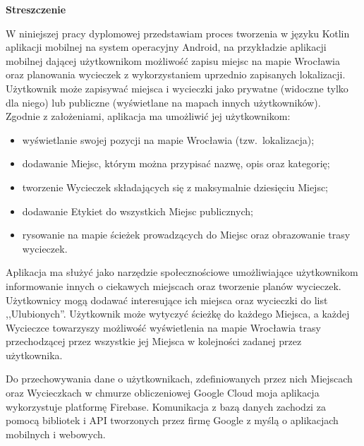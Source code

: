 \newpage

    \begin{flushleft}
    \Large \textbf{Streszczenie}
    \end{flushleft}

    \vspace{1cm}
        W niniejszej pracy dyplomowej przedstawiam proces tworzenia w języku Kotlin aplikacji mobilnej na system operacyjny Android, na przykładzie
        aplikacji mobilnej dającej użytkownikom możliwość zapisu miejsc na mapie Wrocławia oraz planowania wycieczek z wykorzystaniem uprzednio zapisanych lokalizacji.
        Użytkownik może zapisywać miejsca i wycieczki jako prywatne (widoczne tylko dla niego) lub publiczne (wyświetlane na mapach innych użytkowników). \\ 
        
        
        \noindent Zgodnie z założeniami, aplikacja ma umożliwić jej użytkownikom:
        \begin{itemize}
            \item wyświetlanie swojej pozycji na mapie Wrocławia (tzw.\ lokalizacja);
            \item dodawanie Miejsc, którym można przypisać nazwę, opis oraz kategorię;
            \item tworzenie Wycieczek składających się z maksymalnie dziesięciu Miejsc;
            \item dodawanie Etykiet do wszystkich Miejsc publicznych; 
            \item rysowanie na mapie ścieżek prowadzących do Miejsc oraz obrazowanie trasy wycieczek. 
        \end{itemize}

        Aplikacja ma służyć jako narzędzie społecznościowe umożliwiające użytkownikom informowanie innych o ciekawych miejscach oraz tworzenie planów wycieczek.
        Użytkownicy mogą dodawać interesujące ich miejsca oraz wycieczki do list ,,Ulubionych''. 
        Użytkownik może wytyczyć ścieżkę do każdego Miejsca, a każdej
        Wycieczce towarzyszy możliwość wyświetlenia na mapie Wrocławia trasy przechodzącej przez wszystkie jej Miejsca w kolejności zadanej przez użytkownika. 

        Do przechowywania dane o użytkownikach, zdefiniowanych przez nich Miejscach oraz Wycieczkach w chmurze obliczeniowej Google Cloud moja aplikacja wykorzystuje platformę Firebase.
        Komunikacja z bazą danych zachodzi za pomocą bibliotek i API tworzonych przez firmę Google z myślą o aplikacjach mobilnych i webowych.

